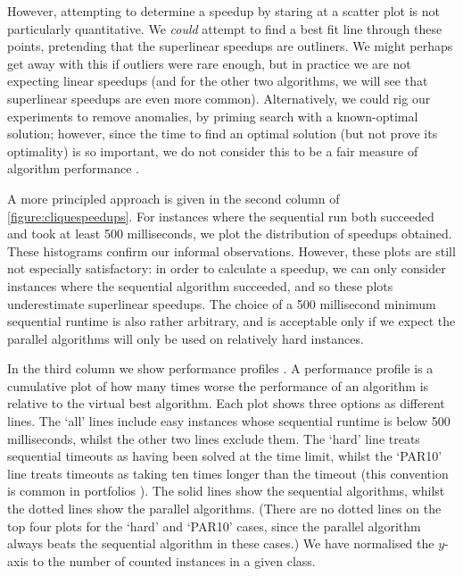 \documentclass{llncs}
\begin{document}
However, attempting to determine a speedup by staring at a scatter plot is not particularly
quantitative. We \emph{could} attempt to find a best fit line through these points, pretending that
the superlinear speedups are outliners. We might perhaps get away with this if outliers were rare
enough, but in practice we are not expecting linear speedups (and for the other two algorithms, we
will see that superlinear speedups are even more common). Alternatively, we could rig our
experiments to remove anomalies, by priming search with a known-optimal solution; however, since the
time to find an optimal solution (but not prove its optimality) is so important, we do not consider
this to be a fair measure of algorithm performance \cite{DBLP:journals/topc/McCreeshP15}.

A more principled approach is given in the second column of \cref{figure:cliquespeedups}. For
instances where the sequential run both succeeded and took at least 500 milliseconds, we plot the
distribution of speedups obtained. These histograms confirm our informal observations. However,
these plots are still not especially satisfactory: in order to calculate a speedup, we can only
consider instances where the sequential algorithm succeeded, and so these plots underestimate
superlinear speedups. The choice of a 500 millisecond minimum sequential runtime is also rather
arbitrary, and is acceptable only if we expect the parallel algorithms will only be used on
relatively hard instances.

In the third column we show performance profiles \cite{DBLP:journals/mp/DolanM02}. A performance
profile is a cumulative plot of how many times worse the performance of an algorithm is relative to
the virtual best algorithm. Each plot shows three options as different lines. The `all' lines
include easy instances whose sequential runtime is below 500 milliseconds, whilst the other two
lines exclude them. The `hard' line treats sequential timeouts as having been solved at the time
limit, whilst the `PAR10' line treats timeouts as taking ten times longer than the timeout (this
convention is common in portfolios \cite{DBLP:conf/aaai/XuHL10}). The solid lines show the
sequential algorithms, whilst the dotted lines show the parallel algorithms. (There are no dotted
lines on the top four plots for the `hard' and `PAR10' cases, since the parallel algorithm always
beats the sequential algorithm in these cases.) We have normalised the $y$-axis to the number of
counted instances in a given class.
\end{document}
